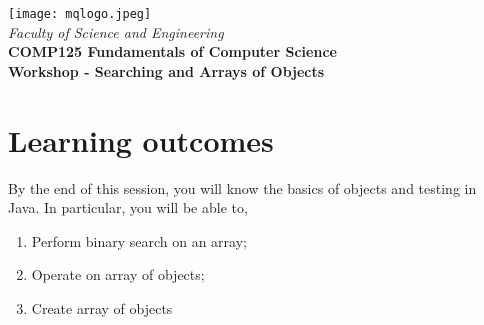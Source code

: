 
\usepackage[colorlinks=true,urlcolor=red]{hyperref}
\setlength{\topmargin}{-0.5in}                  %
\setlength{\textheight}{9.5in}                  %
\setlength{\oddsidemargin}{0in}                 %
\setlength{\evensidemargin}{0in}                %
\setlength{\textwidth}{6.5in}                   %
\setlength{\parindent}{0.0in}
\newcommand{\code}{\texttt}




%
\vspace{0.2in}
\begin{center}
        {\large  %
\texttt{[image: mqlogo.jpeg]}\\
\medskip
        {\it  Faculty of Science and Engineering\\}
        \vspace{0.2in}
         {\bf COMP125 Fundamentals of Computer Science\\
        Workshop - Searching and Arrays of Objects}}
\end{center}
\vspace{0.3in}
%

\renewcommand{\labelenumi}{\alph{enumi}.}
 
\section*{Learning outcomes}

By the end of this session, you will know the basics of objects and testing in Java. In particular, you will be able to,

\begin{enumerate}
\item Perform binary search on an array;
\item Operate on array of objects;
\item Create array of objects
\end{enumerate}
\vskip 0.5cm


